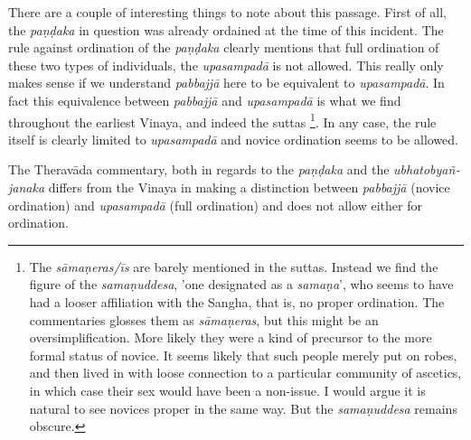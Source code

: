 There are a couple of interesting things to note about this passage. First of all, the {\em paṇḍaka} in question was already ordained at the time of this incident. The rule against ordination of the {\em paṇḍaka} clearly mentions that full ordination of these two types of individuals, the {\em upasampadā} is not allowed. This really only makes sense if we understand {\em pabbajjā} here to be equivalent to {\em upasampadā}. In fact this equivalence between {\em pabbajjā} and {\em upasampadā} is what we find throughout the earliest Vinaya, and indeed the suttas \footnote{The {\em sāmaṇeras/īs} are barely mentioned in the suttas. Instead we find the figure of the {\em samaṇuddesa}, 'one designated as a {\em samaṇa}', who seems to have had a looser affiliation with the Sangha, that is, no proper ordination. The commentaries glosses them as {\em sāmaṇeras}, but this might be an oversimplification. More likely they were a kind of precursor to the more formal status of novice. It seems likely that such people merely put on robes, and then lived in with loose connection to a particular community of ascetics, in which case their sex would have been a non-issue. I would argue it is natural to see novices proper in the same way. But the {\em samaṇuddesa} remains obscure.}. In any case, the rule itself is clearly limited to {\em upasampadā} and novice ordination seems to be allowed.

The Theravāda commentary, both in regards to the {\em paṇḍaka} and the {\em ubhatob­yañ­janaka} differs from the Vinaya in making a distinction between {\em pabbajjā} (novice ordination) and {\em upasampadā} (full ordination) and does not allow either for ordination.

